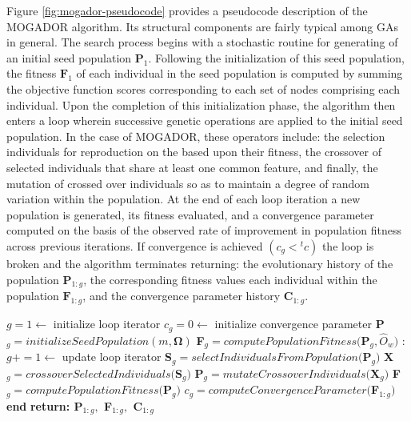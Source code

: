 Figure \ref{fig:mogador-pseudocode} provides a pseudocode description of the MOGADOR algorithm. Its structural components are fairly typical among GAs in general. The search process begins with a stochastic routine for generating of an initial seed population $\textbf{P}_1$. Following the initialization of this seed population, the fitness $\textbf{F}_1$ of each individual in the seed population is computed by summing the objective function scores corresponding to each set of nodes comprising each individual. Upon the completion of this initialization phase, the algorithm then enters a loop wherein successive genetic operations are applied to the initial seed population. In the case of MOGADOR, these operators include: the selection individuals for reproduction on the based upon their fitness, the crossover of selected individuals that share at least one common feature, and finally, the mutation of crossed over individuals so as to maintain a degree of random variation within the population. At the end of each loop iteration a new population is generated, its fitness evaluated, and a convergence parameter computed on the basis of the observed rate of improvement in population fitness across previous iterations. If convergence is achieved $(c_g < {}^{t}c)$ the loop is broken and the algorithm terminates returning: the evolutionary history of the population $\textbf{P}_{1:g}$, the corresponding fitness values each individual within the population $\textbf{F}_{1:g}$, and the convergence parameter history $\textbf{C}_{1:g}$. \\

                \begin{algorithm}
                \caption{}\label{euclid}
                \begin{algorithmic}[1]
                \State $g = 1 \gets$ initialize loop iterator
                \State $c_g = 0 \gets$ initialize convergence parameter
                \State \textbf{P}$_g = initializeSeedPopulation(m,\boldsymbol\Omega)$
                \State \textbf{F}$_g = computePopulationFitness($\textbf{P}$_g,\hat{O}_w)$ 
                :
                \State $g += 1 \gets$ update loop iterator
                \State \textbf{S}$_g = selectIndividualsFromPopulation($\textbf{P}$_g)$
                \State \textbf{X}$_g = crossoverSelectedIndividuals($\textbf{S}$_g)$
                \State \textbf{P}$_g = mutateCrossoverIndividuals($\textbf{X}$_g)$
                \State \textbf{F}$_g = computePopulationFitness($\textbf{P}$_g)$
                \State $c_g = computeConvergenceParameter($\textbf{F}$_{1:g})$
                \State \textbf{end}
                \EndWhile
                \State \textbf{return: \textbf{P}$_{1:g},$ \textbf{F}$_{1:g},$ \textbf{C}$_{1:g}$}
                \EndProcedure
                \end{algorithmic}
                \end{algorithm}
                

